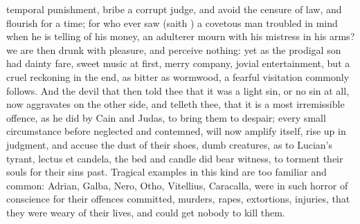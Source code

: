 {temporal punishment, bribe a corrupt judge, and avoid the censure
of law, and flourish for a time; for who ever saw (saith
\Chrysostom{}) a covetous man troubled in mind when he is telling of his
money, an adulterer mourn with his mistress in his arms? we are then
drunk with pleasure, and perceive nothing: yet as the prodigal son had
dainty fare, sweet music at first, merry company, jovial entertainment,
but a cruel reckoning in the end, as bitter as wormwood, a fearful
visitation commonly follows. And the devil that then told thee that it
was a light sin, or no sin at all, now aggravates on the other side,
and telleth thee, that it is a most irremissible offence, as he did by
Cain and Judas, to bring them to despair; every small circumstance
before neglected and contemned, will now amplify itself, rise up in
judgment, and accuse the dust of their shoes, dumb creatures, as to
Lucian's tyrant, lectus et candela, the bed and candle did bear
witness, to torment their souls for their sins past. Tragical examples
in this kind are too familiar and common: Adrian, Galba, Nero, Otho,
Vitellius, Caracalla, were in such horror of conscience for their
offences committed, murders, rapes, extortions, injuries, that they
were weary of their lives, and could get nobody to kill them.

}
